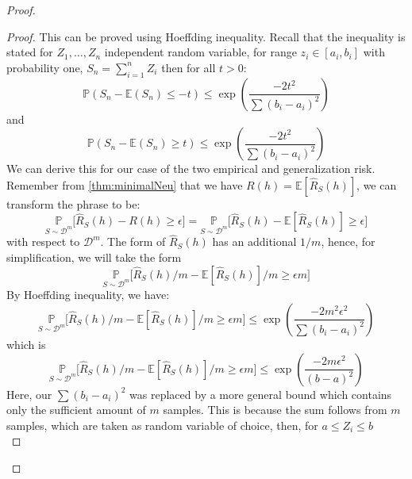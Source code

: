 \begin{proof}
\begin{proof}
    This can be proved using Hoeffding inequality. Recall that the inequality is stated for $Z_{1},\dots,Z_{n}$ independent random variable, for range $z_{i}\in [a_{i},b_{i}]$ with probability one, $S_{n}=\sum_{i=1}^{n}Z_{i}$ then for all $t>0$:
    \begin{equation*}
        \mathbb{P}(S_{n} - \mathbb{E}(S_n)\leq -t) \leq \exp{\left(\frac{-2t^2}{\sum (b_{i} - a_{i})^{2}}\right)}
    \end{equation*}
    and 
    \begin{equation*}
        \mathbb{P}(S_{n} - \mathbb{E}(S_n)\geq t) \leq \exp{\left(\frac{-2t^2}{\sum (b_{i} - a_{i})^{2}}\right)}
    \end{equation*}
    We can derive this for our case of the two empirical and generalization risk. Remember from \ref{thm:minimalNeu} that we have $R(h)=\mathbb{E}[\hat{R}_{S}(h)]$, we can transform the phrase to be: \begin{equation*}
        \underset{S\sim \mathcal{D}^{m}}{\mathbb{P}} \Big[ \hat{R}_{S}(h) - R(h) \geq \epsilon \Big] = \underset{S\sim \mathcal{D}^{m}}{\mathbb{P}} \Big[ \hat{R}_{S}(h) - \mathbb{E}[\hat{R}_{S}(h)] \geq \epsilon \Big]
    \end{equation*}
    with respect to $\mathcal{D}^{m}$. The form of $\hat{R}_{S}(h)$ has an additional $1/m$, hence, for simplification, we will take the form \begin{equation*}
        \underset{S\sim \mathcal{D}^{m}}{\mathbb{P}} \Big[ \hat{R}_{S}(h)/m - \mathbb{E}[\hat{R}_{S}(h)]/m \geq \epsilon m \Big]
    \end{equation*}
    By Hoeffding inequality, we have: 
    \begin{equation}
        \underset{S\sim \mathcal{D}^{m}}{\mathbb{P}} \Big[ \hat{R}_{S}(h)/m - \mathbb{E}[\hat{R}_{S}(h)]/m \geq \epsilon m \Big] \leq \exp{\left(\frac{-2m^{2}\epsilon^{2}}{\sum (b_{i} - a_{i})^{2}}\right)} 
    \end{equation}
    which is 
    \begin{equation*}
        \underset{S\sim \mathcal{D}^{m}}{\mathbb{P}} \Big[ \hat{R}_{S}(h)/m - \mathbb{E}[\hat{R}_{S}(h)]/m \geq \epsilon m \Big] \leq \exp{\left(\frac{-2m\epsilon^{2}}{(b-a)^{2}}\right)}
    \end{equation*}
    Here, our $\sum (b_{i} - a_{i})^{2}$ was replaced by a more general bound which contains only the sufficient amount of $m$ samples. This is because the sum follows from $m$ samples, which are taken as random variable of choice, then, for $a\leq Z_i \leq b$ \begin{equation*}

\end{equation*}
\end{proof}
\end{proof}

